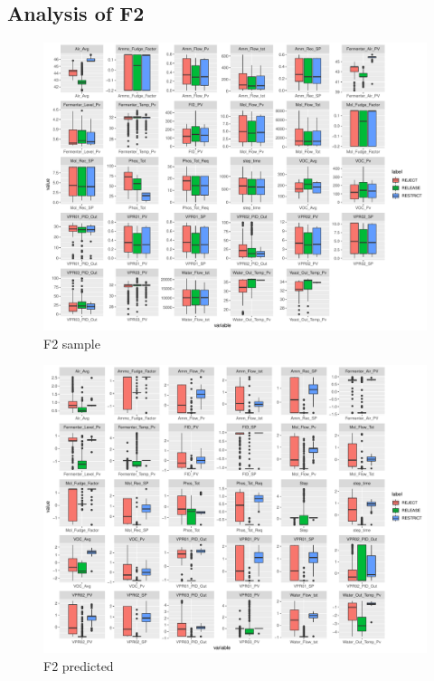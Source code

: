 \subsection{Analysis of F2}
\begin{figure}
    \centering
    \includegraphics[width=1.0\textwidth]{plots/f2-sample.pdf}
    \caption{F2 sample}
    \label{fig:f2_sample}
\end{figure}

\begin{figure}
    \centering
    \includegraphics[width=1.0\textwidth]{plots/f2-predicted.pdf}
    \caption{F2 predicted}
    \label{fig:f2_predicted}
\end{figure}

